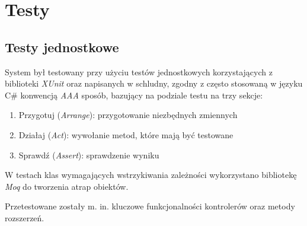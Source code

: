\documentclass[eng,printmode,openany]{mgr}
\begin{document}
	
	\newpage
	\chapter{Testy}
	\section{Testy jednostkowe}
	System był testowany przy użyciu testów jednostkowych korzystających z biblioteki \textit{XUnit} oraz napisanych w schludny, zgodny z często stosowaną w języku C\# konwencją \textit{AAA} sposób, bazujący na podziale testu na trzy sekcje:
	\begin{enumerate}
		\item Przygotuj (\textit{Arrange}): przygotowanie niezbędnych zmiennych
		\item Działaj (\textit{Act}): wywołanie metod, które mają być testowane 
		\item Sprawdź (\textit{Assert}): sprawdzenie wyniku 
	\end{enumerate}
	W testach klas wymagających wstrzykiwania zależności wykorzystano bibliotekę \textit{Moq} do tworzenia atrap obiektów.
	
	Przetestowane zostały m. in. kluczowe funkcjonalności kontrolerów oraz metody rozszerzeń.
	
	
	\newpage
	
	
	\newpage
\end{document}
